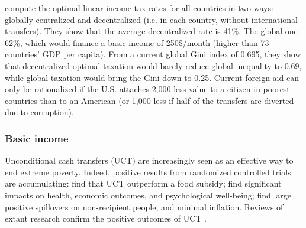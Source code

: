 \citet{kopczuk_limitations_2005} compute the optimal linear income tax rates for all countries in two ways: globally centralized and decentralized (i.e. in each country, without international transfers). They show that the average decentralized rate is 41\%. The global one 62\%, which would finance a basic income of 250\$/month (higher than 73 countries' GDP per capita). From a current global Gini index of 0.695, they show that decentralized optimal taxation would barely reduce global inequality to 0.69, while global taxation would bring the Gini down to 0.25. Current foreign aid can only be rationalized if the U.S. attaches 2,000 less value to a citizen in poorest countries than to an American (or 1,000 less if half of the transfers are diverted due to corruption). 


\subsubsection{Basic income}\label{subsubsec:literature_basic_income}

Unconditional cash transfers (UCT) are increasingly seen as an effective way to end extreme poverty. Indeed, positive results from randomized controlled trials are accumulating: \citet{gangopadhyay_cash_2015} find that UCT outperform a food subsidy; \citet{haushofer_short-term_2016} find significant impacts on health, economic outcomes, and psychological well-being; \citet{egger_general_2022} find large positive spillovers on non-recipient people, and minimal inflation. 
Reviews of extant research confirm the positive outcomes of UCT \citep{standing_little_2014,bastagli_cash_2016}.

